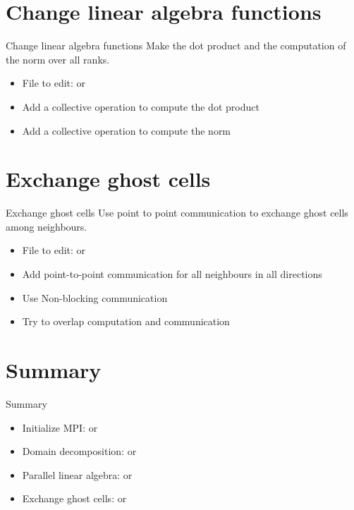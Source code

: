 \documentclass[aspectratio=43]{beamer}
\begin{document}
\section{Change linear algebra functions}
\begin{frame}[fragile]{Change linear algebra functions}
Make the dot product and the computation of the norm over all ranks.
\begin{itemize}
\item File to edit:  or 
\item Add a collective operation to compute the dot product
\item Add a collective operation to compute the norm
\end{itemize}
\end{frame}

\section{Exchange ghost cells}
\begin{frame}[fragile]{Exchange ghost cells}
Use point to point communication to exchange ghost cells among neighbours.
\begin{itemize}
\item File to edit:  or 
\item Add point-to-point communication for all neighbours in all directions
\item Use Non-blocking communication
\item Try to overlap computation and communication
\end{itemize}
\end{frame}

\section{Summary}
\begin{frame}[fragile]{Summary}
\begin{itemize}
\item Initialize MPI:\@ {} or 
\item Domain decomposition:  or 
\item Parallel linear algebra:  or 
\item Exchange ghost cells:  or 
\end{itemize}
\end{frame}

\end{document}
